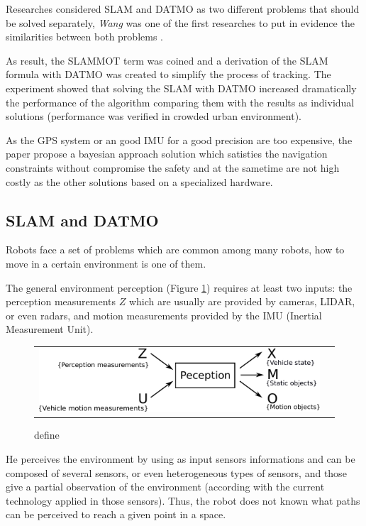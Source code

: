Researches considered SLAM and DATMO as two different problems that should be solved separately, \textit{Wang} was one of the first researches to put in evidence the similarities between both problems \cite{Wang03onlinesimultaneous}.

As result, the SLAMMOT term was coined and a derivation of the SLAM formula with DATMO was created to simplify the process of tracking. The experiment showed that solving the SLAM with DATMO increased dramatically the performance of the algorithm comparing them with the results as individual solutions (performance was verified in crowded urban environment).

As the GPS system or an good IMU for a good precision are too expensive, the paper propose a bayesian approach solution which satisties the navigation constraints without compromise the safety and at the sametime are not high costly as the other solutions based on a specialized hardware.

\subsection{SLAM and DATMO}

Robots face a set of problems which are common among many robots, how to move in a certain environment is one of them.

The general environment perception (Figure \ref{fig:perception:cycle}) requires at least two inputs: the perception measurements $Z$ which are usually are provided by cameras, LIDAR, or even radars, and motion measurements provided by the IMU (Inertial Measurement Unit).

\begin{figure}[h]
   \centering
     \begin{tabular}{lr}
       \includegraphics[scale=0.5]{img/fig:perception:cycle}
     \end{tabular}
   \caption{define}
   \label{fig:perception:cycle}
 \end{figure}


He perceives the environment by using as input sensors informations and can be composed of several sensors, or even heterogeneous types of sensors, and those give a partial observation of the environment (according with the current technology applied in those sensors). Thus, the robot does not known what paths can be perceived to reach a given point in a space.

